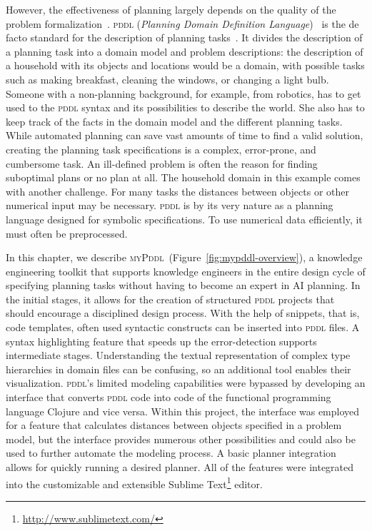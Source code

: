 \documentclass[runningheads]{llncs}
\newcommand{\mypddl}{\textsc{myPddl}\xspace}
\newcommand{\pddl}{\textsc{pddl}\xspace}
\begin{document}
However, the effectiveness of planning largely depends on the quality
of the problem formalization~\cite{shah2013knowledge}. \pddl
(\emph{Planning Domain Definition Language})~\cite{mcdermott1998pddl}
is the de facto standard for the description of planning
tasks~\cite{ilghami2005extension}. It divides the description of a
planning task into a domain model and problem descriptions: the
description of a household with its objects and locations would be a
domain, with possible tasks such as making breakfast, cleaning the
windows, or changing a light bulb. Someone with a non-planning
background, for example, from robotics, has to get used to the \pddl
syntax and its possibilities to describe the world. She also has to
keep track of the facts in the domain model and the different planning
tasks. While automated planning can save vast amounts of time to find
a valid solution, creating the planning task specifications is a
complex, error-prone, and cumbersome task. An ill-defined problem is
often the reason for finding suboptimal plans or no plan at all.  The
household domain in this example comes with another challenge. For
many tasks the distances between objects or other numerical input may
be necessary. \pddl is by its very nature as a planning language
designed for symbolic specifications. To use numerical data
efficiently, it must often be preprocessed.

In this chapter, we describe
\mypddl~(Figure~\ref{fig:mypddl-overview}), a knowledge engineering
toolkit that supports knowledge engineers in the entire design cycle
of specifying planning tasks without having to become an expert in AI
planning. In the initial stages, it allows for the creation of
structured \pddl projects that should encourage a disciplined design
process. With the help of snippets, that is, code templates, often
used syntactic constructs can be inserted into \pddl files. A syntax
highlighting feature that speeds up the error-detection supports
intermediate stages. Understanding the textual representation of
complex type hierarchies in domain files can be confusing, so an
additional tool enables their visualization. \pddl's limited modeling
capabilities were bypassed by developing an interface that converts
\pddl code into code of the functional programming language Clojure
\cite{hickey2008clojure} and vice versa.  Within this project, the
interface was employed for a feature that calculates distances between
objects specified in a problem model, but the interface provides
numerous other possibilities and could also be used to further
automate the modeling process. A basic planner integration allows for
quickly running a desired planner. All of the features were integrated
into the customizable and extensible Sublime
Text\footnote{\url{http://www.sublimetext.com/}} editor.
\end{document}
